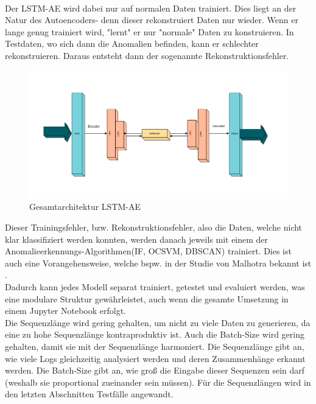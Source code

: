 \documentclass[a4paper,12pt]{article}
\begin{document}
	\\[0.5em]
	Der LSTM-AE wird dabei nur auf normalen Daten trainiert. Dies liegt an der Natur des Autoencoders- denn dieser rekonstruiert Daten nur wieder. Wenn er lange genug trainiert wird, "lernt" er nur "normale" Daten zu konstruieren. In Testdaten, wo sich dann die Anomalien befinden, kann er schlechter rekonstruieren. Daraus entsteht dann der sogenannte Rekonstruktionsfehler.
	\\[0.5em]
	\begin{figure}[H]
		\centering
		\includegraphics[width=1.2\linewidth]{Bilder/screenshot-lstm}
		\caption{Gesamtarchitektur LSTM-AE}
		\label{fig:screenshot-lstm}
	\end{figure}
	Dieser Trainingsfehler, bzw. Rekonstruktionsfehler, also die Daten, welche nicht klar klassifiziert werden konnten, werden danach jeweils mit einem der Anomalieerkennungs-Algorithmen(IF, OCSVM, DBSCAN) trainiert. Dies ist auch eine Vorangehensweise, welche bspw. in der Studie von Malhotra bekannt ist \cite{malhotra2016lstm}.
	\\[0.5em]
	Dadurch kann jedes Modell separat trainiert, getestet und evaluiert werden, was eine modulare Struktur gewährleistet, auch wenn die gesamte Umsetzung in einem Jupyter Notebook erfolgt.
	\\[0.5em]
	Die Sequenzlänge wird gering gehalten, um nicht zu viele Daten zu generieren, da eine zu hohe Sequenzlänge kontraproduktiv ist. Auch die Batch-Size wird gering gehalten, damit sie mit der Sequenzlänge harmoniert. Die Sequenzlänge gibt an, wie viele Logs gleichzeitig analysiert werden und deren Zusammenhänge erkannt werden. Die Batch-Size gibt an, wie groß die Eingabe dieser Sequenzen sein darf (weshalb sie proportional zueinander sein müssen). Für die Sequenzlängen wird in den letzten Abschnitten Testfälle angewandt.
	
	
\end{document}
